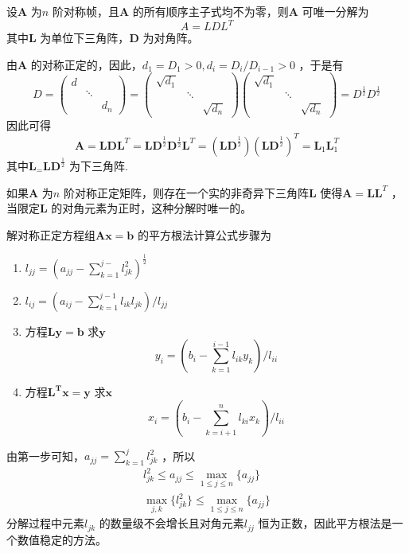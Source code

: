 \documentclass[a4paper]{article}
\begin{document}
\begin{theorem}
	设$\mathbf{A}$ 为$n$ 阶对称帧，且$\mathbf{A}$ 的所有顺序主子式均不为零，则$\mathbf{A}$ 可唯一分解为
	\[
		A = LDL^{T}
	\] 
	其中$\mathbf{L}$ 为单位下三角阵，$\mathbf{D}$ 为对角阵。
\end{theorem}
由$\mathbf{A}$ 的对称正定的，因此，$d_1 = D_1 > 0, d_i = D_i / D_{i-1} > 0$ ，于是有
\[
	D = \begin{pmatrix}
		d & & \\
		  & \ddots & \\
		  & & d_n
	\end{pmatrix} = 
	\begin{pmatrix} 
		\sqrt{d_1} & & \\
		& \ddots & \\
		& & \sqrt{d_n} 
	\end{pmatrix} 
	\begin{pmatrix} 
		\sqrt{d_1} & & \\
		& \ddots & \\
		& & \sqrt{d_n} 
	\end{pmatrix} = D^{\frac{1}{2}} D^{\frac{1}{2}}
\] 
因此可得
\[
\mathbf{A} = \mathbf{LDL}^{T} = \mathbf{LD}^{\frac{1}{2}} \mathbf{D}^{\frac{1}{2}}\mathbf{L}^{T} = (\mathbf{LD}^{\frac{1}{2}}) (\mathbf{LD}^{\frac{1}{2}})^{T} = \mathbf{L}_1 \mathbf{L}_1^{T}
\] 
其中$\mathbf{L}_ = \mathbf{LD}^{\frac{1}{2}}$ 为下三角阵.

\begin{theorem}
	如果$\mathbf{A}$ 为$n$ 阶对称正定矩阵，则存在一个实的非奇异下三角阵$\mathbf{L}$ 使得$\mathbf{A} = \mathbf{LL}^{T}$ ，当限定$\mathbf{L}$ 的对角元素为正时，这种分解时唯一的。
\end{theorem}

解对称正定方程组$\mathbf{Ax} = \mathbf{b}$ 的平方根法计算公式步骤为
\begin{enumerate}
	\item $l_{jj} = (a_{jj} - \sum_{k=1}^{j-} l_{jk}^2)^{\frac{1}{2}}$ 
	\item $l_{ij} = (a_{ij} - \sum_{k=1}^{j-1} l_{ik} l_{jk}) / l_{jj}$ 
	\item 方程$\mathbf{Ly} = \mathbf{b}$ 求$\mathbf{y}$
		\[
			y_{i} = (b_i - \sum_{k=1}^{i-1} l_{ik} y_k) / l_{ii}
		\] 
	\item 方程$\mathbf{L^{T}x} = \mathbf{y}$ 求$\mathbf{x}$ 
		\[
			x_{i} = (b_i - \sum_{k=i+1}^{n} l_{ki} x_k) / l_{ii}
		\] 
\end{enumerate}
由第一步可知，$a_{jj} = \sum_{k=1}^{j} l_{jk}^2$ ，所以
\[
	\begin{align*}
		l_{jk}^2 \le a_{jj} \le \max_{1 \le j \le n} \{ a_{jj} \} \\
		\max_{j, k} \{ l_{jk}^2 \} \le \max_{1 \le j \le n} \{a_{jj}\}  	
	\end{align*}
\] 
分解过程中元素$l_{jk}$ 的数量级不会增长且对角元素$l_{jj}$ 恒为正数，因此平方根法是一个数值稳定的方法。
\end{document}
